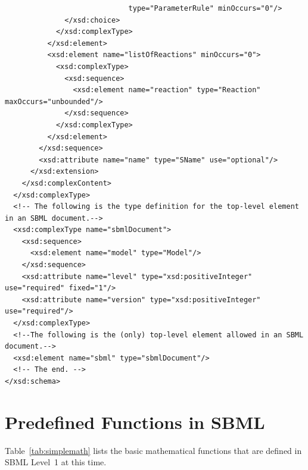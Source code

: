 \documentclass[10pt]{cekarticle}
\begin{document}
\begin{small}
\begin{verbatim}
                             type="ParameterRule" minOccurs="0"/>
              </xsd:choice>
            </xsd:complexType>
          </xsd:element>
          <xsd:element name="listOfReactions" minOccurs="0">
            <xsd:complexType>
              <xsd:sequence>
                <xsd:element name="reaction" type="Reaction" maxOccurs="unbounded"/>
              </xsd:sequence>
            </xsd:complexType>
          </xsd:element>
        </xsd:sequence>
        <xsd:attribute name="name" type="SName" use="optional"/>
      </xsd:extension>
    </xsd:complexContent>
  </xsd:complexType>
  <!-- The following is the type definition for the top-level element in an SBML document.-->
  <xsd:complexType name="sbmlDocument">
    <xsd:sequence>
      <xsd:element name="model" type="Model"/>
    </xsd:sequence>
    <xsd:attribute name="level" type="xsd:positiveInteger" use="required" fixed="1"/>
    <xsd:attribute name="version" type="xsd:positiveInteger" use="required"/>
  </xsd:complexType>
  <!--The following is the (only) top-level element allowed in an SBML document.-->
  <xsd:element name="sbml" type="sbmlDocument"/>
  <!-- The end. -->
</xsd:schema>
\end{verbatim}
\regularspacing
\end{small}


\newpage

\section{Predefined Functions in SBML}
\label{apdx:predefined-functions}

Table~\ref{tab:simplemath} lists the basic mathematical functions that are
defined in SBML Level~1 at this time.
\end{document}
